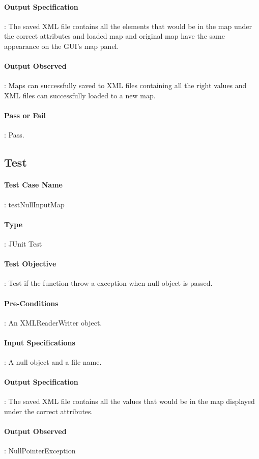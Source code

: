 \documentclass[12pt, a4paper]{report}
\begin{document}
\paragraph{Output Specification}: The saved XML file contains all the elements that would be in the map under the correct attributes and loaded map and original map have the same appearance on the GUI's map panel.
\paragraph{Output Observed}: Maps can successfully saved to XML files containing all the right values and XML files can successfully loaded to a new map.
\paragraph{Pass or Fail}: Pass.

\addtocounter{casecounter}{1}
\subsection{Test }
\paragraph{Test Case Name}: testNullInputMap
\paragraph{Type}: JUnit Test
\paragraph{Test Objective}: Test if the function throw a exception when null object is passed.
\paragraph{Pre-Conditions}: An XMLReaderWriter object.
\paragraph{Input Specifications}: A null object and a file name.
\paragraph{Output Specification}: The saved XML file contains all the values that would be in the map displayed under the correct attributes.
\paragraph{Output Observed}: NullPointerException
\end{document}
